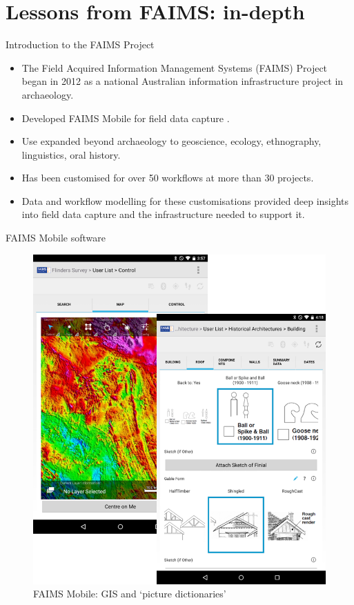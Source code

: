 \documentclass[aspectratio=169, 12pt]{beamer} %
\begin{document}
\section{Lessons from FAIMS: in-depth}

\begin{frame}{Introduction to the FAIMS Project}
    \begin{itemize}[label=\textbullet]
        \item The Field Acquired Information Management Systems (FAIMS) Project began in 2012 as a national Australian information infrastructure project in archaeology.
        \item Developed FAIMS Mobile for field data capture \cite{Ballsun-Stanton2018-zd}.
        \item Use expanded beyond archaeology to geoscience, ecology, ethnography, linguistics, oral history.
        \item Has been customised for over 50 workflows at more than 30 projects. 
        \item Data and workflow modelling for these customisations provided deep insights into field data capture and the infrastructure needed to support it.
    \end{itemize}
\end{frame}

\begin{frame}{FAIMS Mobile software}
 \begin{figure}[H]
    \centering
        \includegraphics[height=.75\textheight]{figures/FAIMS-screenshots.png}
        \caption{FAIMS Mobile: GIS and `picture dictionaries'}
        \label{fig:figure10}
 \end{figure}
\end{frame}
\end{document}
